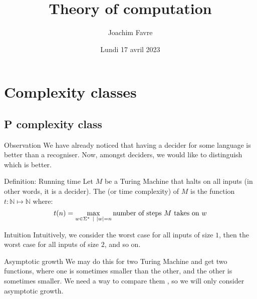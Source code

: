 \documentclass[a4paper]{article}
\title{Theory of computation}
\author{Joachim Favre}
\date{Lundi 17 avril 2023}
\begin{document}
\maketitle


\section{Complexity classes}

\subsection{P complexity class}

\begin{parag}{Observation}
    We have already noticed that having a decider for some language is better than a recogniser. Now, amongst deciders, we would like to distinguish which is better.
\end{parag}

\begin{parag}{Definition: Running time}
    Let $M$ be a Turing Machine that halts on all inputs (in other words, it is a decider). The  (or time complexity) of $M$ is the function $t: \mathbb{N} \mapsto \mathbb{N}$ where: 
    \[t\left(n\right) = \max_{w \in \Sigma^* \suchthat \left|w\right| = n} \text{number of steps $M$ takes on $w$}\]
    
    \begin{subparag}{Intuition}
        Intuitively, we consider the worst case for all inputs of size $1$, then the worst case for all inputs of size $2$, and so on.
    \end{subparag}
\end{parag}

\begin{parag}{Asymptotic growth}
    We may do this for two Turing Machine and get two functions, where one is sometimes smaller than the other, and the other is sometimes smaller. We need a way to compare them , so we will only consider asymptotic growth.
\end{parag}
\end{document}
